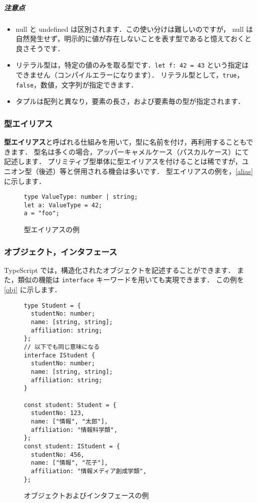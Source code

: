 \documentclass[a4j, 11pt]{jarticle}
\begin{document}
\subparagraph{注意点}

\begin{itemize}
  \setlength{\itemsep}{0mm}
  \item null と undefined は区別されます．この使い分けは難しいのですが，
  null は自然発生せず，明示的に値が存在しないことを表す型であると憶えておくと良さそうです．
  \item リテラル型は，特定の値のみを取る型です．\verb|let f: 42 = 43| という指定はできません（コンパイルエラーになります）．
  リテラル型として，\verb|true|，\verb|false|，数値，文字列が指定できます．
  \item タプルは配列と異なり，要素の長さ，および要素毎の型が指定されます．
\end{itemize}

\subsubsection{型エイリアス}

\textbf{型エイリアス}と呼ばれる仕組みを用いて，型に名前を付け，再利用することもできます．
型名は多くの場合，アッパーキャメルケース（パスカルケース）にて記述します．
プリミティブ型単体に型エイリアスを付けることは稀ですが，ユニオン型（後述）等と併用される機会は多いです．
型エイリアスの例を，\autoref{alias} に示します．

\begin{figure}[H]
\caption{型エイリアスの例}
\label{alias}
\begin{lstlisting}
type ValueType: number | string;
let a: ValueType = 42;
a = "foo";
\end{lstlisting}
\end{figure}

\subsubsection{オブジェクト，インタフェース}

TypeScript では，構造化されたオブジェクトを記述することができます．
また，類似の機能は \verb|interface| キーワードを用いても実現できます．
この例を \autoref{obj} に示します．

\begin{figure}
\caption{オブジェクトおよびインタフェースの例}
\label{obj}
\begin{lstlisting}
type Student = {
  studentNo: number;
  name: [string, string];
  affiliation: string;
};
// 以下でも同じ意味になる
interface IStudent {
  studentNo: number;
  name: [string, string];
  affiliation: string;
}

const student: Student = {
  studentNo: 123,
  name: ["情報", "太郎"],
  affiliation: "情報科学類",
};
const student: IStudent = {
  studentNo: 456,
  name: ["情報", "花子"],
  affiliation: "情報メディア創成学類",
};
\end{lstlisting}
\end{figure}
  
\end{document}
